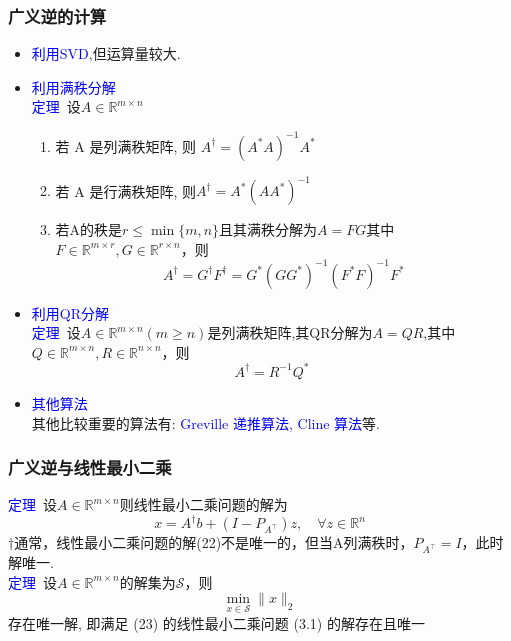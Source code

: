 \documentclass[12pt,a4paper]{article}
\begin{document}
\subsubsection{广义逆的计算}
\begin{itemize}
	\item \textcolor{blue}{利用SVD},但运算量较大.
	\item \textcolor{blue}{利用满秩分解}\\
	\textcolor{blue}{定理}~设$A \in \mathbb{R}^{m \times n}$
	\begin{enumerate}[(1)]
		\item 若 A 是列满秩矩阵, 则 $A^{\dagger}=\left(A^{*} A\right)^{-1} A^{*}$
		\item 若 A 是行满秩矩阵, 则$A^{\dagger}=A^{*}\left(A A^{*}\right)^{-1}$
		\item 若A的秩是$r \leq \min \{m, n\}$且其满秩分解为$A=F G$其中$F \in \mathbb{R}^{m \times r}, G \in \mathbb{R}^{r \times n}$，则
		$$
		A^{\dagger}=G^{\dagger} F^{\dagger}=G^{*}\left(G G^{*}\right)^{-1}\left(F^{*} F\right)^{-1} F^{*}
		$$
	\end{enumerate}
	\item \textcolor{blue}{利用QR分解}\\
	\textcolor{blue}{定理}~设$A \in \mathbb{R}^{m \times n}(m \geq n)$是列满秩矩阵,其QR分解为$A=QR$,其中$Q \in \mathbb{R}^{m \times n}, R \in \mathbb{R}^{n \times n}$，则
	$$
	A^{\dagger}=R^{-1} Q^{*}
	$$
	\item \textcolor{blue}{其他算法}\\
	其他比较重要的算法有: \textcolor{blue}{Greville 递推算法, Cline 算法}等.
\end{itemize}
\subsubsection{广义逆与线性最小二乘}
\noindent \textcolor{blue}{定理}~设$A \in \mathbb{R}^{m \times n}$则线性最小二乘问题的解为
\begin{equation} 
x=A^{\dagger} b+\left(I-P_{A^{\top}}\right) z, \quad \forall z \in \mathbb{R}^{n}
\end{equation}
$\dagger$通常，线性最小二乘问题的解(22)不是唯一的，但当A列满秩时，$P_{A^{\top}}=I$，此时解唯一.\\
\textcolor{blue}{定理}~设$A \in \mathbb{R}^{m \times n}$的解集为$\mathcal{S}$，则
\begin{equation} 
\min _{x \in \mathcal{S}}\|x\|_{2}
\end{equation} 
存在唯一解, 即满足 (23) 的线性最小二乘问题 (3.1) 的解存在且唯一
\end{document}
